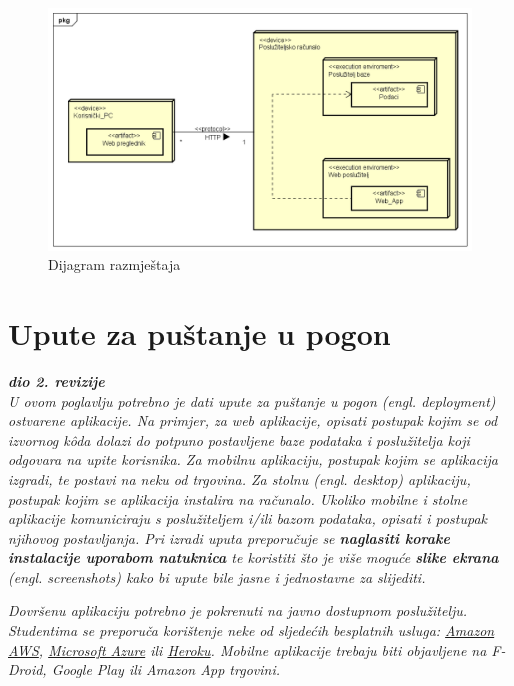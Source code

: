 			\begin{figure}[hp]
                    \centering
                    \includegraphics[width=16cm]{slike/Dijagram_razmjestaja.png}
                    \caption{Dijagram razmještaja}
                    \label{fig:DR_01}
                \end{figure}
			    
			\eject 
			
		
		\section{Upute za puštanje u pogon}
		
			\textbf{\textit{dio 2. revizije}}\\
		
			 \textit{U ovom poglavlju potrebno je dati upute za puštanje u pogon (engl. deployment) ostvarene aplikacije. Na primjer, za web aplikacije, opisati postupak kojim se od izvornog kôda dolazi do potpuno postavljene baze podataka i poslužitelja koji odgovara na upite korisnika. Za mobilnu aplikaciju, postupak kojim se aplikacija izgradi, te postavi na neku od trgovina. Za stolnu (engl. desktop) aplikaciju, postupak kojim se aplikacija instalira na računalo. Ukoliko mobilne i stolne aplikacije komuniciraju s poslužiteljem i/ili bazom podataka, opisati i postupak njihovog postavljanja. Pri izradi uputa preporučuje se \textbf{naglasiti korake instalacije uporabom natuknica} te koristiti što je više moguće \textbf{slike ekrana} (engl. screenshots) kako bi upute bile jasne i jednostavne za slijediti.}
			
			
			 \textit{Dovršenu aplikaciju potrebno je pokrenuti na javno dostupnom poslužitelju. Studentima se preporuča korištenje neke od sljedećih besplatnih usluga: \href{https://aws.amazon.com/}{Amazon AWS}, \href{https://azure.microsoft.com/en-us/}{Microsoft Azure} ili \href{https://www.heroku.com/}{Heroku}. Mobilne aplikacije trebaju biti objavljene na F-Droid, Google Play ili Amazon App trgovini.}
			
			
			\eject 
